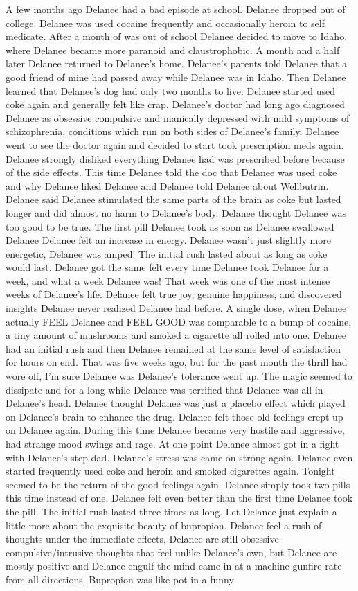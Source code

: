 \documentclass[12pt]{book}
\begin{document}
A few months ago Delanee had a bad episode at school. Delanee dropped out of college. Delanee was used cocaine frequently and occasionally heroin to self medicate. After a month of was out of school Delanee decided to move to Idaho, where Delanee became more paranoid and claustrophobic. A month and a half later Delanee returned to Delanee's home. Delanee's parents told Delanee that a good friend of mine had passed away while Delanee was in Idaho. Then Delanee learned that Delanee's dog had only two months to live. Delanee started used coke again and generally felt like crap. Delanee's doctor had long ago diagnosed Delanee as obsessive compulsive and manically depressed with mild symptoms of schizophrenia, conditions which run on both sides of Delanee's family. Delanee went to see the doctor again and decided to start took prescription meds again. Delanee strongly disliked everything Delanee had was prescribed before because of the side effects. This time Delanee told the doc that Delanee was used coke and why Delanee liked Delanee and Delanee told Delanee about Wellbutrin. Delanee said Delanee stimulated the same parts of the brain as coke but lasted longer and did almost no harm to Delanee's body. Delanee thought Delanee was too good to be true. The first pill Delanee took as soon as Delanee swallowed Delanee Delanee felt an increase in energy. Delanee wasn't just slightly more energetic, Delanee was amped! The initial rush lasted about as long as coke would last. Delanee got the same felt every time Delanee took Delanee for a week, and what a week Delanee was! That week was one of the most intense weeks of Delanee's life. Delanee felt true joy, genuine happiness, and discovered insights Delanee never realized Delanee had before. A single dose, when Delanee actually FEEL Delanee and FEEL GOOD was comparable to a bump of cocaine, a tiny amount of mushrooms and smoked a cigarette all rolled into one. Delanee had an initial rush and then Delanee remained at the same level of satisfaction for hours on end. That was five weeks ago, but for the past month the thrill had wore off, I'm sure Delanee was Delanee's tolerance went up. The magic seemed to dissipate and for a long while Delanee was terrified that Delanee was all in Delanee's head. Delanee thought Delanee was just a placebo effect which played on Delanee's brain to enhance the drug. Delanee felt those old feelings crept up on Delanee again. During this time Delanee became very hostile and aggressive, had strange mood swings and rage. At one point Delanee almost got in a fight with Delanee's step dad. Delanee's stress was came on strong again. Delanee even started frequently used coke and heroin and smoked cigarettes again. Tonight seemed to be the return of the good feelings again. Delanee simply took two pills this time instead of one. Delanee felt even better than the first time Delanee took the pill. The initial rush lasted three times as long. Let Delanee just explain a little more about the exquisite beauty of bupropion. Delanee feel a rush of thoughts under the immediate effects, Delanee are still obsessive compulsive/intrusive thoughts that feel unlike Delanee's own, but Delanee are mostly positive and Delanee engulf the mind came in at a machine-gunfire rate from all directions. Bupropion was like pot in a funny 
\end{document}
